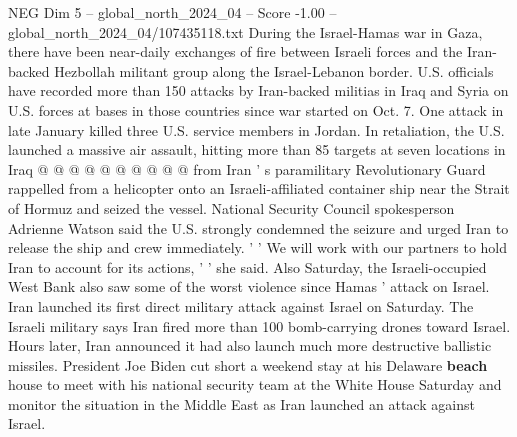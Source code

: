 \begin{textsample}{NEG Dim 5 – global\_north\_2024\_04 – Score -1.00 – global\_north\_2024\_04/107435118.txt}
During the Israel-Hamas war in Gaza, there have been near-daily exchanges of fire between Israeli forces and the Iran-backed Hezbollah militant group along the Israel-Lebanon border.
U.S. officials have recorded more than 150 attacks by Iran-backed militias in Iraq and Syria on U.S. forces at bases in those countries since war started on Oct. 7.
One attack in late January killed three U.S. service members in Jordan.
In retaliation, the U.S. launched a massive air assault, hitting more than 85 targets at seven locations in Iraq @ @ @ @ @ @ @ @ @ @ from Iran ' s paramilitary Revolutionary Guard rappelled from a helicopter onto an Israeli-affiliated container ship near the Strait of Hormuz and seized the vessel.
National Security Council spokesperson Adrienne Watson said the U.S. strongly condemned the seizure and urged Iran to release the ship and crew immediately. ' ' We will work with our partners to hold Iran to account for its actions, ' ' she said.
Also Saturday, the Israeli-occupied West Bank also saw some of the worst violence since Hamas ' attack on Israel.
Iran launched its first direct military attack against Israel on Saturday.
The Israeli military says Iran fired more than 100 bomb-carrying drones toward Israel.
Hours later, Iran announced it had also launch much more destructive ballistic missiles.
President Joe Biden cut short a weekend stay at his Delaware \textbf{beach} house to meet with his national security team at the White House Saturday and monitor the situation in the Middle East as Iran launched an attack against Israel.

\end{textsample}
